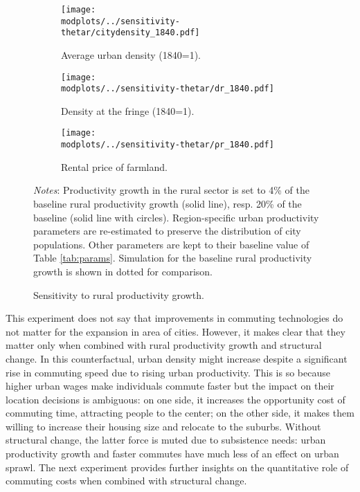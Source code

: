 \documentclass[./20250130-paper.tex]{subfiles}
\begin{document}
\begin{figure}[p]
	\begin{adjustbox}{center}
		\begin{subfigure}{\pthree\textwidth}
			\texttt{[image: \\modplots/../sensitivity-thetar/citydensity\_1840.pdf]}
			\caption{Average urban density (1840=1).\label{fig:model-sensi-thetar-avgd}}
		\end{subfigure}
		\begin{subfigure}{\pthree\textwidth}
			\texttt{[image: \\modplots/../sensitivity-thetar/dr\_1840.pdf]}
			\caption{Density at the fringe (1840=1).\label{fig:model-sensi-thetar-dr}}
		\end{subfigure}
		\begin{subfigure}{\pthree\textwidth}
			\texttt{[image: \\modplots/../sensitivity-thetar/ρr\_1840.pdf]}
			\caption{Rental price of farmland.\label{fig:model-sensi-thetar-rhor}}
		\end{subfigure}
	\end{adjustbox}
	\caption{Sensitivity to rural productivity growth.\label{fig:model-sensi-thetar}}
	
	{\footnotesize \textit{Notes}: Productivity growth in the rural sector is set to 4\% of the baseline rural productivity growth (solid line), resp. 20\% of the baseline (solid line with circles). Region-specific urban productivity parameters are re-estimated to preserve the distribution of city populations. Other parameters are kept to their baseline value of Table \ref{tab:params}. Simulation for the baseline rural productivity growth is shown in dotted for comparison.}
\end{figure}

This experiment does not say that improvements in commuting technologies do not matter for the expansion in area of cities. However, it makes clear that they matter only when combined with rural productivity growth and structural change. In this counterfactual, urban density might increase despite a significant rise in commuting speed due to rising urban productivity. This is so because higher urban wages make individuals commute faster but the impact on their location decisions is ambiguous: on one side, it increases the opportunity cost of commuting time, attracting people to the center; on the other side, it makes them willing to increase their housing size and relocate to the suburbs. Without structural change, the latter force is muted due to subsistence needs: urban productivity growth and faster commutes have much less of an effect on urban sprawl. The next experiment provides further insights on the quantitative role of commuting costs when combined with structural change.
\end{document}
